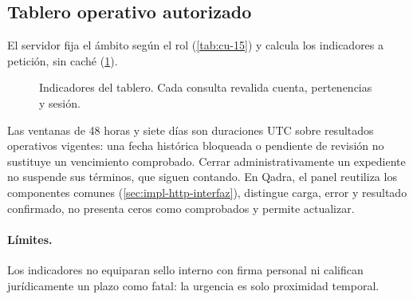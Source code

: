 \subsection{Tablero operativo autorizado}\label{sec:impl-tablero}

El servidor fija el ámbito según el rol (\cref{tab:cu-15}) y calcula los
indicadores a petición, sin caché (\cref{fig:impl-tablero}).

\begin{figure}[!htbp]
  \centering
  
  \caption{Indicadores del tablero. Cada consulta revalida cuenta, pertenencias y
  sesión.}
  \label{fig:impl-tablero}
\end{figure}

Las ventanas de 48 horas y siete días son duraciones UTC sobre resultados
operativos vigentes: una fecha histórica bloqueada o
pendiente de revisión no sustituye un vencimiento comprobado. Cerrar
administrativamente un expediente no suspende sus términos, que siguen contando.
En Qadra, el panel reutiliza los componentes comunes
(\cref{sec:impl-http-interfaz}), distingue carga, error y resultado confirmado,
no presenta ceros como comprobados y permite actualizar.

\paragraph{Límites.} Los indicadores no equiparan sello interno con firma
personal ni califican jurídicamente un plazo como fatal: la urgencia es solo
proximidad temporal.

